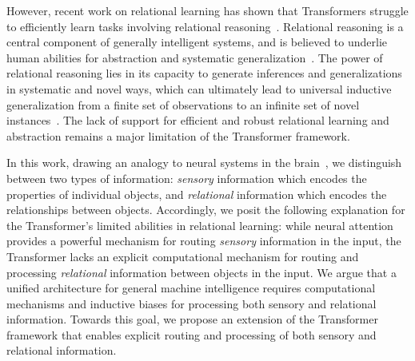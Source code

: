 However, recent work on relational learning has shown that Transformers struggle to efficiently learn tasks involving relational reasoning~\citep{lake2018generalization,barrett2018measuring,santoroSimpleNeuralNetwork2017,santoroRelationalRecurrentNeural2018,shanahanExplicitlyRelationalNeurala,webbEmergentSymbolsBinding2021,webbRelationalBottleneckInductive2024,kergNeuralArchitectureInductive2022,altabaa2024abstractors,altabaaLearningHierarchicalRelational2024}. Relational reasoning is a central component of generally intelligent systems, and is believed to underlie human abilities for abstraction and systematic generalization~\citep{snow1984topography,kemp2008discovery,holyoak2012analogy}. The power of relational reasoning lies in its capacity to generate inferences and generalizations in systematic and novel ways, which can ultimately lead to universal inductive generalization from a finite set of observations to an infinite set of novel instances~\citep{goyal2022inductive}. The lack of support for efficient and robust relational learning and abstraction remains a major limitation of the Transformer framework.

In this work, drawing an analogy to neural systems in the brain~\citep{newman1997neural}, we distinguish between two types of information: \textit{sensory} information which encodes the properties of individual objects, and \textit{relational} information which encodes the relationships between objects. Accordingly, we posit the following explanation for the Transformer's limited abilities in relational learning: while neural attention provides a powerful mechanism for routing \textit{sensory} information in the input, the Transformer lacks an explicit computational mechanism for routing and processing \textit{relational} information between objects in the input. We argue that a unified architecture for general machine intelligence requires computational mechanisms and inductive biases for processing both sensory and relational information. Towards this goal, we propose an extension of the Transformer framework that enables explicit routing and processing of both sensory and relational information.

